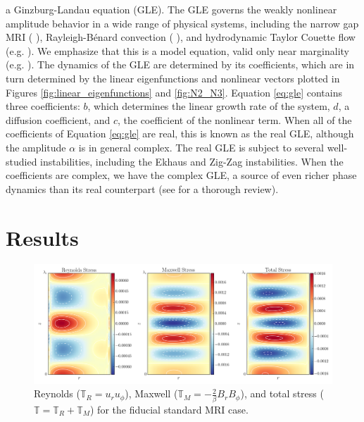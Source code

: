 \documentclass{emulateapj}
\newcommand{\citei}[1]{\citeauthor{#1} \citeyear{#1}}
\begin{document}
a Ginzburg-Landau equation (GLE). The GLE governs the weakly nonlinear amplitude behavior in a wide range of physical systems, including the narrow gap MRI (\citei{Umurhan:2007hs}), Rayleigh-B\'enard convection (\citei{Newell:1969wr}), and hydrodynamic Taylor Couette flow (e.g. \citei{Recktenwald:1993}). We emphasize that this is a model equation, valid only near marginality (e.g. \citei{Cross:1993el}). The dynamics of the GLE are determined by its coefficients, which are in turn determined by the linear eigenfunctions and nonlinear vectors plotted in Figures \ref{fig:linear_eigenfunctions} and \ref{fig:N2_N3}. Equation \ref{eq:gle} contains three coefficients: $b$, which determines the linear growth rate of the system, $d$, a diffusion coefficient, and $c$, the coefficient of the nonlinear term. When all of the coefficients of Equation \ref{eq:gle} are real, this is known as the real GLE, although the amplitude $\alpha$ is in general complex. The real GLE is subject to several well-studied instabilities, including the Ekhaus and Zig-Zag instabilities. When the coefficients are complex, we have the complex GLE, a source of even richer phase dynamics than its real counterpart (see \citei{Aranson:2002} for a thorough review).


\section{Results}

\begin{figure}
\centering
\includegraphics[width=\textwidth]{../figures/widegap_rey_max_tot_stresses.png}
\caption{Reynolds ($\mathbb{T}_{R} = u_r u_\phi$), Maxwell ($\mathbb{T}_{M} = -\frac{2}{\beta} B_r B_\phi$), and total stress ($\mathbb{T} = \mathbb{T}_{R} + \mathbb{T}_{M}$) for the fiducial standard MRI case. }
\end{figure}
\end{document}
